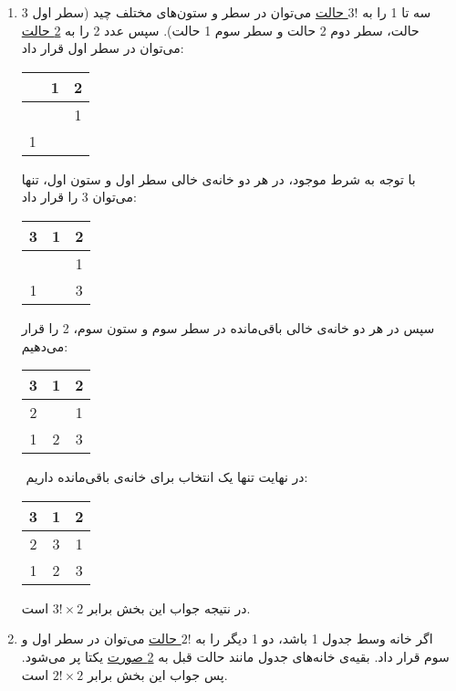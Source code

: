 \begin{enumerate}
    \item
  سه تا 1 را به 
	\underline{$3!$ حالت}
	 می‌توان در سطر و ستون‌های مختلف چید
	(سطر اول 3 حالت، سطر دوم 2 حالت و سطر سوم 1 حالت).
	سپس عدد 2 را به 
   \underline{2 حالت}
  می‌توان در سطر اول قرار داد:
  \vspace*{+0.4cm}
	 \begin{center}
	\begin{tabular}{ |c|c|c| } 
     \hline
       & 1 & 2  \\ 
     \hline
       &   & 1 \\ 
     \hline
     1 &  &   \\ 
     \hline
    \end{tabular}
    \end{center}
    \vspace*{+0.4cm}
   با توجه به شرط موجود، در هر دو خانه‌ی خالی سطر اول و ستون اول، تنها می‌توان 3 را قرار داد:
   \vspace*{+0.4cm}
    \begin{center}
      \begin{tabular}{ |c|c|c| } 
         \hline
          3 & 1 & 2 \\ 
         \hline
           &   & 1 \\ 
         \hline
          1 &   & 3 \\ 
         \hline
        \end{tabular}
        \end{center}
        \vspace*{+0.4cm}
        سپس در هر دو خانه‌ی خالی باقی‌مانده در سطر سوم و ستون سوم، 2 را قرار می‌دهیم:
        \vspace*{+0.4cm}
    \begin{center}
      \begin{tabular}{ |c|c|c| } 
         \hline
          3 & 1 & 2 \\ 
         \hline
          2  &   & 1 \\ 
         \hline
          1 & 2 & 3 \\ 
         \hline
        \end{tabular}
        \end{center}
        \vspace*{+0.4cm}
     ‌ در نهایت تنها یک انتخاب برای خانه‌ی باقی‌مانده داریم:
     \vspace*{+0.4cm}
    \begin{center}
	\begin{tabular}{ |c|c|c| } 
     \hline
      3 & 1 & 2 \\ 
     \hline
      2 & 3 & 1 \\ 
     \hline
      1 & 2 & 3 \\ 
     \hline
    \end{tabular}
    \end{center}
    \vspace*{+0.4cm}
     در نتیجه جواب این بخش برابر
    $3! \times 2$ 
    است.
    
    \item
    اگر خانه وسط جدول 1 باشد، دو 1 دیگر را به 
    \underline{$2!$ حالت}
    می‌توان در سطر اول و سوم قرار داد. بقیه‌ی خانه‌های جدول مانند حالت قبل به 
    \underline{2 صورت}
    یکتا پر می‌شود. پس جواب این بخش 
    برابر
    $2! \times 2$
    است.
    \end{enumerate}